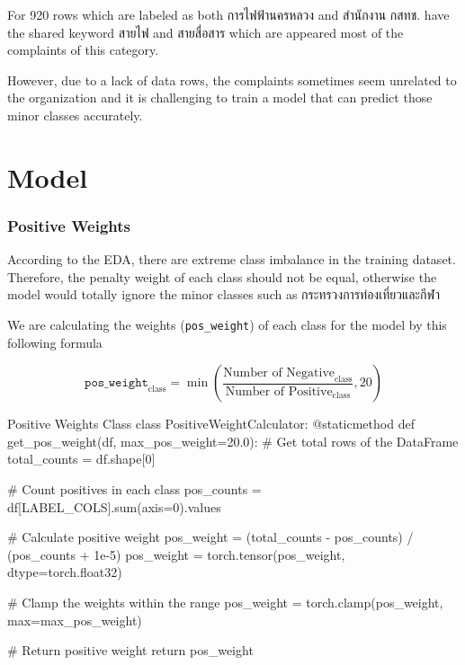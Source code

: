 \documentclass[12pt, a4paper]{article}
\begin{document}
                    \vspace{0.5em}

                    For 920 rows which are labeled as both การไฟฟ้านครหลวง and สำนักงาน กสทช. have the shared keyword
                    สายไฟ and สายสื่อสาร which are appeared most of the complaints of this category.

                    \vspace{0.5em}

                    However, due to a lack of data rows, the complaints sometimes seem unrelated to the organization
                    and it is challenging to train a model that can predict those minor classes accurately.

    \pagebreak

    \part{Model}
        \section{Positive Weights}
            According to the EDA, there are extreme class imbalance in the training dataset.
            Therefore, the penalty weight of each class should not be equal, otherwise
            the model would totally ignore the minor classes such as กระทรวงการท่องเที่ยวและกีฬา

            \vspace{0.5em}

            We are calculating the weights (\texttt{pos\_weight}) of each class for the model
            by this following formula

            $$
                {\texttt{pos\_weight}}_{\text{class}}
                =
                \min \left( \frac{{\text{Number of Negative}}_\text{class}}{{\text{Number of Positive}}_\text{class}}, 20 \right)
            $$

            \begin{codeblock}{Positive Weights Class}
                class PositiveWeightCalculator:
                    @staticmethod
                    def get_pos_weight(df, max_pos_weight=20.0):
                        # Get total rows of the DataFrame
                        total_counts = df.shape[0]

                        # Count positives in each class
                        pos_counts = df[LABEL_COLS].sum(axis=0).values

                        # Calculate positive weight
                        pos_weight = (total_counts - pos_counts) / (pos_counts + 1e-5)
                        pos_weight = torch.tensor(pos_weight, dtype=torch.float32)

                        # Clamp the weights within the range
                        pos_weight = torch.clamp(pos_weight, max=max_pos_weight)

                        # Return positive weight
                        return pos_weight
            \end{codeblock}
\end{document}

